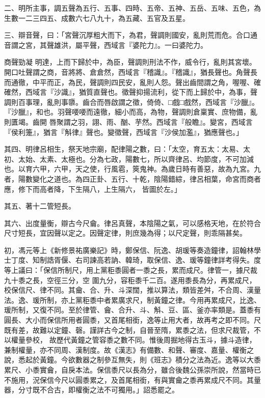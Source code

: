 \begin{pinyinscope}
 二、明所主事，調五聲為五行、五事、四時、五帝、五神、五岳、五味、五色，為生數一二三四五、成數六七八九十，為五藏、五官及五星。



 三、辯音聲，曰：「宮聲沉厚粗大而下，為君，聲調則國安，亂則荒而危。合口通音謂之宮，其聲雄洪，屬平聲，西域言『婆陀力』。一曰婆陀力。



 商聲勁凝
 明達，上而下歸於中，為臣，聲調則刑法不作，威令行，亂則其宮壞。開口吐聲謂之商，音將將、倉倉然，西域言『稽識』。『稽識』，猶長聲也。角聲長而通徹，中平而正，為民，聲調則四民安，亂則人怨。聲出齒間謂之角，喔喔、確確然，西域言『沙識』，猶質直聲也。徵聲抑揚流利，從下而上歸於中，為事，聲調則百事理，亂則事隳。齒合而唇啟謂之徵，倚倚、□戲□戲然，西域言『沙臘』。『沙臘』，和也。羽聲喓喓而遠徹，細小而高，為物，聲調則倉稟實、庶物備，亂則匱竭。齒開
 唇聚謂之羽，詡、雨、酗、芋然。西域言『般瞻』。變宮，西域言『侯利箑』，猶言『斛律』聲也。變徵聲，西域言『沙侯加濫』，猶應聲也。」



 其四、明律呂相生，祭天地宗廟，配律陽之數，曰：「太空，育五太：太易、太初、太始、太素、太極也。分為七政，陽數七，所以齊律呂、均節度，不可加減也。以育六甲，六甲，天之使，行風雹，筴鬼神。為歲日時有善惡，故為九宮。九者，陽數變化之道也。為四正卦、五行、十乾，陰陽錯綜，律呂相葉，命宮而商者應，修下而高者降，下生隔八，上生隔六，
 皆圖於左。」



 其五、著十二管短長。



 其六、出度量衡，辯古今尺龠。律呂真聲，本陰陽之氣，可以感格天地，在於符合尺寸短長，宜因聲以定之。因聲定律，則庶幾為得；以尺定聲，則乖隔甚矣。



 初，馮元等上《新修景祐廣樂記》時，鄭保信、阮逸、胡瑗等奏造鐘律，詔翰林學士丁度、知制誥胥偃、右司諫高若訥、韓琦，取保信、逸、瑗等鐘律詳考得失。度等上議曰：「保信所制尺，用上黨秬黍圓者一黍之長，累而成尺。律管一，據尺裁九十黍之長，空徑三分，空
 圍九分，容秬黍千二百。遂用黍長為分，再累成尺，校保信尺、律不同。其龠、合、升、斗深闊，推以算法，類皆差舛，不合周、漢量法。逸、瑗所制，亦上黨秬黍中者累廣求尺，制黃鐘之律。今用再累成尺，比逸、瑗所制，又復不同。至於律管、龠、合升、斗、斛、豆、區、釜亦率類是。蓋黍有圓長、大小而保信所用者圓黍，又首尾相銜，逸等止用大者，故再考之即不同。尺既有差，故難以定鐘、磬。謹詳古今之制，自晉至隋，累黍之法，但求尺裁管，不以權量參校，
 故歷代黃鐘之管容黍之數不同。惟後周掘地得古玉斗，據斗造律，兼制權量，亦不同周、漢制度。故《漢志》有備數、和聲、審度、嘉量、權衡之說，悉起於黃鐘。今欲數器之制參互無失，則《班志》積分之法為近。逸等以大黍累尺、小黍實龠，自戾本法。保信黍尺以長為分，雖合後魏公孫崇所說，然當時已不施用，況保信今尺以圓黍累之，及首尾相銜，有與實龠之黍再累成尺不同。其量器，分寸既不合古，即權衡之法不可獨用。」詔悉罷之。




\end{pinyinscope}
